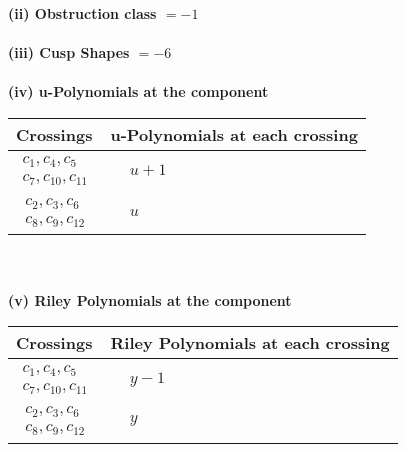 \documentclass[1p]{elsarticle_modified}
\theoremstyle{definition}
\begin{document}
\flushleft \textbf{(ii) Obstruction class $= -1$}\\~\\
\flushleft \textbf{(iii) Cusp Shapes $= -6$}\\~\\
\newpage\renewcommand{\arraystretch}{1}
\flushleft \textbf{(iv) u-Polynomials at the component}\newline \\
\begin{tabular}{m{50pt}|m{274pt}}
Crossings & \hspace{64pt}u-Polynomials at each crossing \\
\hline $$\begin{aligned}c_{1},c_{4},c_{5}\\c_{7},c_{10},c_{11}\end{aligned}$$&$\begin{aligned}
&u+1
\end{aligned}$\\
\hline $$\begin{aligned}c_{2},c_{3},c_{6}\\c_{8},c_{9},c_{12}\end{aligned}$$&$\begin{aligned}
&u
\end{aligned}$\\
\hline
\end{tabular}\\~\\
\newpage\renewcommand{\arraystretch}{1}
\flushleft \textbf{(v) Riley Polynomials at the component}\newline \\
\begin{tabular}{m{50pt}|m{274pt}}
Crossings & \hspace{64pt}Riley Polynomials at each crossing \\
\hline $$\begin{aligned}c_{1},c_{4},c_{5}\\c_{7},c_{10},c_{11}\end{aligned}$$&$\begin{aligned}
&y-1
\end{aligned}$\\
\hline $$\begin{aligned}c_{2},c_{3},c_{6}\\c_{8},c_{9},c_{12}\end{aligned}$$&$\begin{aligned}
&y
\end{aligned}$\\
\hline
\end{tabular}\\~\\
\end{document}
